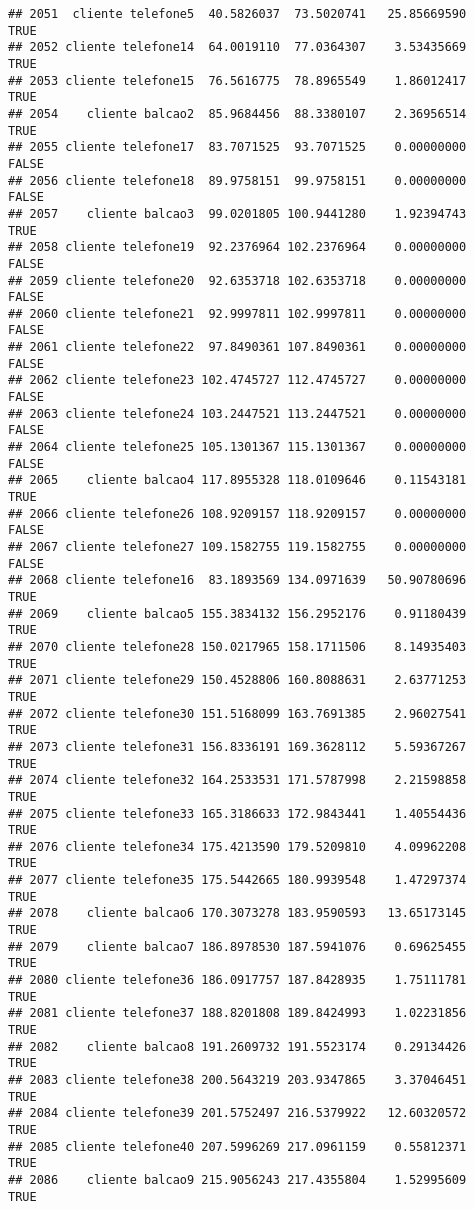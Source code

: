 \documentclass[
]{article}
\begin{document}
\begin{verbatim}
## 2051  cliente telefone5  40.5826037  73.5020741   25.85669590     TRUE
## 2052 cliente telefone14  64.0019110  77.0364307    3.53435669     TRUE
## 2053 cliente telefone15  76.5616775  78.8965549    1.86012417     TRUE
## 2054    cliente balcao2  85.9684456  88.3380107    2.36956514     TRUE
## 2055 cliente telefone17  83.7071525  93.7071525    0.00000000    FALSE
## 2056 cliente telefone18  89.9758151  99.9758151    0.00000000    FALSE
## 2057    cliente balcao3  99.0201805 100.9441280    1.92394743     TRUE
## 2058 cliente telefone19  92.2376964 102.2376964    0.00000000    FALSE
## 2059 cliente telefone20  92.6353718 102.6353718    0.00000000    FALSE
## 2060 cliente telefone21  92.9997811 102.9997811    0.00000000    FALSE
## 2061 cliente telefone22  97.8490361 107.8490361    0.00000000    FALSE
## 2062 cliente telefone23 102.4745727 112.4745727    0.00000000    FALSE
## 2063 cliente telefone24 103.2447521 113.2447521    0.00000000    FALSE
## 2064 cliente telefone25 105.1301367 115.1301367    0.00000000    FALSE
## 2065    cliente balcao4 117.8955328 118.0109646    0.11543181     TRUE
## 2066 cliente telefone26 108.9209157 118.9209157    0.00000000    FALSE
## 2067 cliente telefone27 109.1582755 119.1582755    0.00000000    FALSE
## 2068 cliente telefone16  83.1893569 134.0971639   50.90780696     TRUE
## 2069    cliente balcao5 155.3834132 156.2952176    0.91180439     TRUE
## 2070 cliente telefone28 150.0217965 158.1711506    8.14935403     TRUE
## 2071 cliente telefone29 150.4528806 160.8088631    2.63771253     TRUE
## 2072 cliente telefone30 151.5168099 163.7691385    2.96027541     TRUE
## 2073 cliente telefone31 156.8336191 169.3628112    5.59367267     TRUE
## 2074 cliente telefone32 164.2533531 171.5787998    2.21598858     TRUE
## 2075 cliente telefone33 165.3186633 172.9843441    1.40554436     TRUE
## 2076 cliente telefone34 175.4213590 179.5209810    4.09962208     TRUE
## 2077 cliente telefone35 175.5442665 180.9939548    1.47297374     TRUE
## 2078    cliente balcao6 170.3073278 183.9590593   13.65173145     TRUE
## 2079    cliente balcao7 186.8978530 187.5941076    0.69625455     TRUE
## 2080 cliente telefone36 186.0917757 187.8428935    1.75111781     TRUE
## 2081 cliente telefone37 188.8201808 189.8424993    1.02231856     TRUE
## 2082    cliente balcao8 191.2609732 191.5523174    0.29134426     TRUE
## 2083 cliente telefone38 200.5643219 203.9347865    3.37046451     TRUE
## 2084 cliente telefone39 201.5752497 216.5379922   12.60320572     TRUE
## 2085 cliente telefone40 207.5996269 217.0961159    0.55812371     TRUE
## 2086    cliente balcao9 215.9056243 217.4355804    1.52995609     TRUE

\end{verbatim}
\end{document}
